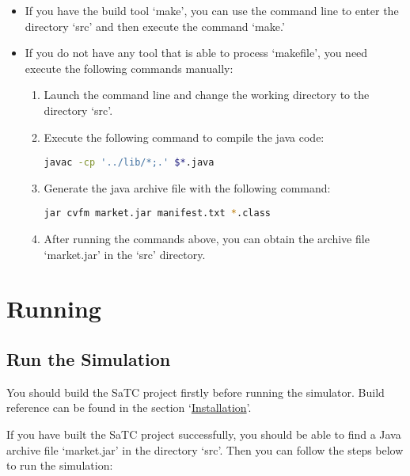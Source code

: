 \documentclass[12pt]{article}
\begin{document}
\begin{itemize}
    \item{If you have the build tool `make', }
    you can use the command line to enter the directory `src' and then execute the command `make.' 
    \item{If you do not have any tool that is able to process `makefile', }
    you need execute the following commands manually: 

    \begin{enumerate}
        \item{Launch the command line and change the working directory to the directory `src'.}
        \item{Execute the following command to compile the java code: } 
            \begin{center}
                \lstinline[language=bash]!javac -cp '../lib/*;.' $*.java!
            \end{center}
        \item{Generate the java archive file with the following command: }
            \begin{center}
                \lstinline[language=bash]!jar cvfm market.jar manifest.txt *.class!
            \end{center}
        \item{After running the commands above, you can obtain the archive file `market.jar' in the `src' directory.}
    \end{enumerate}

\end{itemize}

\section{Running} 
\label{sec:running}

\subsection{Run the Simulation}
\label{subsec:running_runsimulation}

You should build the SaTC project firstly before running the simulator. 
Build reference can be found in the section `\hyperref[sec:installation]{Installation}'. 

\bigskip
\noindent
If you have built the SaTC project successfully, 
you should be able to find a Java archive file `market.jar' in the directory `src'. 
Then you can follow the steps below to run the simulation:
\end{document}

